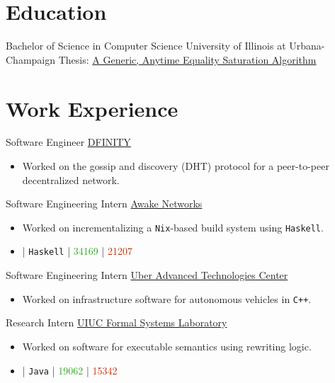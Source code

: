 \documentclass[10pt,letterpaper,sans]{moderncv}
\newcommand{\wlink}[2]{\textcolor[HTML]{0020B6}{\href{#1}{#2}}}
\newcommand{\ghlink}[2]{\wlink{https://github.com/#1}{#2}}
\newcommand{\ghrepo}[1]{\ghlink{#1}{\faGithub}}
\newcommand{\ghlang}[1]{\texttt{#1}}
\newcommand{\ghadd}[1]{\textcolor[HTML]{30A622}{{\faPlusCircle} #1}}
\newcommand{\ghrem}[1]{\textcolor[HTML]{BD2C00}{{\faMinusCircle} #1}}
\newcommand{\ghub}[4]{\ghrepo{#2} | \ghlang{#1} | \ghadd{#3} | \ghrem{#4}}
\newcommand{\lang}[1]{\texttt{#1}}
\begin{document}
\makecvtitle{}

\section{Education}
        {Bachelor of Science in Computer Science}
        {University of Illinois at Urbana-Champaign}
        {}{}
        {
Thesis: \wlink{http://taktoa.me/eqsat/Thesis.pdf}{A Generic, Anytime Equality Saturation Algorithm}
}


\section{Work Experience}
        {Software Engineer}
        {\wlink{http://dfinity.org}{DFINITY}}
        {}{}
        {
\begin{itemize}
\item Worked on the gossip and discovery (DHT) protocol for a peer-to-peer decentralized network.
\end{itemize}
}

        {Software Engineering Intern}
        {\wlink{http://www.awakenetworks.com}{Awake Networks}}
        {}{}
        {
\begin{itemize}
\item Worked on incrementalizing a \lang{Nix}-based build system using \lang{Haskell}.
\item \ghub{Haskell}{awakesecurity/language-ninja}{34169}{21207}
\end{itemize}
}

        {Software Engineering Intern}
        {\wlink{https://www.uber.com/info/atc}{Uber Advanced Technologies Center}}
        {}{}
        {
\begin{itemize}
\item Worked on infrastructure software for autonomous vehicles in \lang{C++}.
\end{itemize}
}

        {Research Intern}
        {\wlink{http://fsl.cs.illinois.edu}{UIUC Formal Systems Laboratory}}
        {}{}{
\begin{itemize}
\item Worked on software for executable semantics using rewriting logic.
\item \ghub{Java}{taktoa/k}{19062}{15342}
\end{itemize}
}
\end{document}
